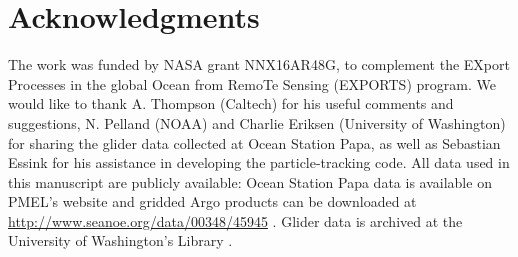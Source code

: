 \documentclass[article,linenumbers]{agujournal2018}
\begin{document}
\section*{Acknowledgments}
The work was funded by NASA grant NNX16AR48G, to complement the EXport Processes in the global Ocean from RemoTe Sensing (EXPORTS) program. We would like to thank A. Thompson (Caltech) for his useful comments and suggestions, N. Pelland (NOAA) and Charlie Eriksen (University of Washington) for sharing the glider data collected at Ocean Station Papa, as well as Sebastian Essink for his assistance in developing the particle-tracking code. All data used in this manuscript are publicly available: Ocean Station Papa data is available on PMEL's website \citep[\url{https://www.pmel.noaa.gov/ocs/Papa};][]{PMEL_data} and gridded Argo products can be downloaded at \url{http://www.seanoe.org/data/00348/45945} \citep{Gaillard_2015}. Glider data is archived at the University of Washington's Library \citep[\url{https://digital.lib.washington.edu/researchworks/handle/1773/41656};][]{Pelland_2018_data}. %


%



%
%


%
%
\end{document}
